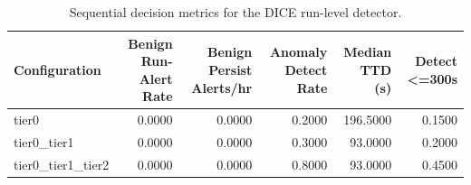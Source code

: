 \begin{table}[t]
\centering
\caption{Sequential decision metrics for the DICE run-level detector.}
\label{tab:dice_sequential_metrics}
\footnotesize
\begin{tabular}{lrrrrr}
\toprule
Configuration & Benign Run-Alert Rate & Benign Persist Alerts/hr & Anomaly Detect Rate & Median TTD (s) & Detect <=300s \\
\midrule
tier0 & 0.0000 & 0.0000 & 0.2000 & 196.5000 & 0.1500 \\
tier0_tier1 & 0.0000 & 0.0000 & 0.3000 & 93.0000 & 0.2000 \\
tier0_tier1_tier2 & 0.0000 & 0.0000 & 0.8000 & 93.0000 & 0.4500 \\
\bottomrule
\end{tabular}

\end{table}
